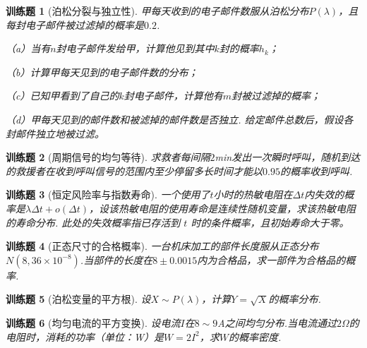 \documentclass[UTF8,12pt,a4paper,fontset=fandol]{ctexbook}
\newtheorem{exercise}{训练题}[section]
\begin{document}
\begin{exercise}[泊松分裂与独立性]\label{q:Y3.9}
甲每天收到的电子邮件数服从泊松分布$P(\lambda)$，且每封电子邮件被过滤掉的概率是$0.2$.

（a）当有$n$封电子邮件发给甲，计算他见到其中$k$封的概率$h_k$；

（b）计算甲每天见到的电子邮件数的分布；

（c）已知甲看到了自己的$k$封电子邮件，计算他有$m$封被过滤掉的概率；

（d）甲每天见到的邮件数和被滤掉的邮件数是否独立. 给定邮件总数后，假设各封邮件独立地被过滤。\par{}\end{exercise}

\begin{exercise}[周期信号的均匀等待]\label{q:Y3.13}
求救者每间隔$2$min发出一次瞬时呼叫，随机到达的救援者在收到呼叫信号的范围内至少停留多长时间才能以$0.95$的概率收到呼叫.\par{}\end{exercise}

\begin{exercise}[恒定风险率与指数寿命]\label{q:Y3.14}
一个使用了$t$小时的热敏电阻在$\Delta t$内失效的概率是$\lambda \Delta t+o(\Delta t)$，设该热敏电阻的使用寿命是连续性随机变量，求该热敏电阻的寿命分布. 此处的失效概率指已存活到 $t$ 时的条件概率，且初始寿命大于零。\par{}\end{exercise}

\begin{exercise}[正态尺寸的合格概率]\label{q:Y3.15}
一台机床加工的部件长度服从正态分布$N(8,36\times 10^{-8})$.当部件的长度在$8\pm 0.0015$内为合格品，求一部件为合格品的概率.\par{}\end{exercise}

\begin{exercise}[泊松变量的平方根]\label{q:Y3.16}
设$X\sim P(\lambda)$，计算$Y=\sqrt{X}$的概率分布.\par{}\end{exercise}

\begin{exercise}[均匀电流的平方变换]\label{q:Y3.17}
设电流$I$在$8\sim 9$A之间均匀分布.当电流通过$2\Omega$的电阻时，消耗的功率（单位：W）是$W=2I^2$，求$W$的概率密度.\par{}\end{exercise}
\end{document}
